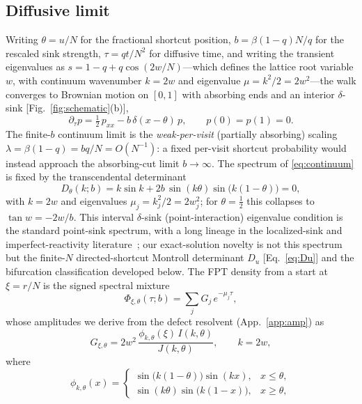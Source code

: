 \documentclass[reprint,amsmath,amssymb,aps,prresearch,longbibliography]{revtex4-2}
\begin{document}
\subsection{Diffusive limit}\label{sec:modelC}
Writing $\theta=u/N$ for the fractional shortcut position, $b=\beta(1-q)N/q$ for the rescaled sink
strength, $\tau=qt/N^2$ for diffusive time, and writing the transient eigenvalues as
$s=1-q+q\cos(2w/N)$---which defines the lattice root variable $w$, with continuum wavenumber $k=2w$
and eigenvalue $\mu=k^2/2=2w^2$---the walk converges to
Brownian motion on $[0,1]$ with absorbing ends and an interior $\delta$-sink [Fig.~\ref{fig:schematic}(b)],
\begin{equation}
\partial_\tau p=\tfrac12\,p_{xx}-b\,\delta(x-\theta)\,p,\qquad p(0)=p(1)=0 .
\label{eq:continuum}
\end{equation}
The finite-$b$ continuum limit is the \emph{weak-per-visit} (partially absorbing) scaling
$\lambda=\beta(1-q)=bq/N=O(N^{-1})$: a fixed per-visit shortcut probability would instead approach
the absorbing-cut limit $b\to\infty$. The spectrum of \eqref{eq:continuum} is fixed by the
transcendental determinant
\begin{equation}
D_\theta(k;b)=k\sin k+2b\,\sin(k\theta)\sin\!\big(k(1-\theta)\big)=0,
\label{eq:Dtheta}
\end{equation}
with $k=2w$ and eigenvalues $\mu_j=k_j^2/2=2w_j^2$; for $\theta=\tfrac12$ this collapses to
$\tan w=-2w/b$. This interval $\delta$-sink (point-interaction) eigenvalue condition is the standard
point-sink spectrum, with a long lineage in the localized-sink and imperfect-reactivity
literature~\cite{Albeverio2005,WilemskiFixman1973,SzaboSchulten1980,Grebenkov2020,Bressloff2022};
our exact-solution novelty is not this spectrum
but the finite-$N$ directed-shortcut Montroll determinant $D_u$ [Eq.~\eqref{eq:Du}] and the bifurcation
classification developed below. The FPT density from a start at $\xi=r/N$ is the signed spectral mixture
\begin{equation}
\Phi_{\xi,\theta}(\tau;b)=\sum_j G_j\, e^{-\mu_j\tau},
\label{eq:Phi}
\end{equation}
whose amplitudes we derive from the defect resolvent (App.~\ref{app:amp}) as
\begin{equation}
G_{\xi,\theta}=2w^2\,\frac{\phi_{k,\theta}(\xi)\,I(k,\theta)}{J(k,\theta)},\qquad k=2w,
\label{eq:G}
\end{equation}
where
\begin{equation}
\phi_{k,\theta}(x)=
\begin{cases}
\sin\!\big(k(1-\theta)\big)\sin(kx), & x\le\theta,\\[2pt]
\sin(k\theta)\sin\!\big(k(1-x)\big), & x\ge\theta,
\end{cases}
\label{eq:phi}
\end{equation}
\end{document}
